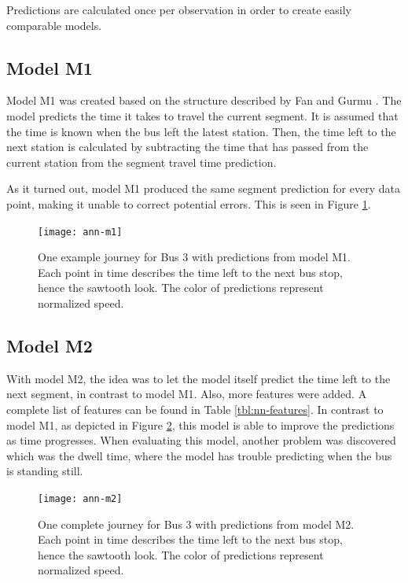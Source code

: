 Predictions are calculated once per observation in order to create easily comparable models.

\subsection{Model M1}
Model M1 was created based on the structure described by Fan and Gurmu \cite{brazilANN}. The model predicts the time it takes to travel the current segment. It is assumed that the time is known when the bus left the latest station. Then, the time left to the next station is calculated by subtracting the time that has passed from the current station from the segment travel time prediction.

As it turned out, model M1 produced the same segment prediction for every data point, making it unable to correct potential errors. This is seen in Figure \ref{fig:ann-m1}.


\begin{figure}[h]
	\begin{minipage}{\textwidth}
		\begin{adjustbox}{center}
			\texttt{[image: ann-m1]}
		\end{adjustbox}  
		\caption{One example journey for Bus 3 with predictions from model M1. Each point in time describes the time left to the next bus stop, hence the sawtooth look. The color of predictions represent normalized speed.}
		\label{fig:ann-m1}      
	\end{minipage}
\end{figure}


\subsection{Model M2}\label{M2}
With model M2, the idea was to let the model itself predict the time left to the next segment, in contrast to model M1. Also, more features were added. A complete list of features can be found in Table \ref{tbl:nn-features}. In contrast to model M1, as depicted in Figure \ref{fig:ann-m2}, this model is able to improve the predictions as time progresses. When evaluating this model, another problem was discovered which was the dwell time, where the model has trouble predicting when the bus is standing still. 


\begin{figure}[h]
	\begin{minipage}{\textwidth}
		\begin{adjustbox}{center}
			\texttt{[image: ann-m2]}
		\end{adjustbox}  
		\caption{One complete journey for Bus 3 with predictions from model M2. Each point in time describes the time left to the next bus stop, hence the sawtooth look. The color of predictions represent normalized speed.}
		\label{fig:ann-m2}      
	\end{minipage}
\end{figure}



